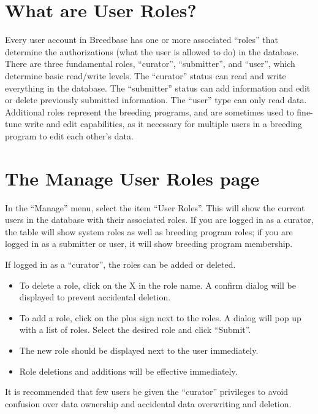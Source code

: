 \documentclass[
  12pt,
]{book}
\providecommand{\tightlist}{%
  \setlength{\itemsep}{0pt}\setlength{\parskip}{0pt}}
\begin{document}
\hypertarget{what-are-user-roles}{%
\section{What are User Roles?}\label{what-are-user-roles}}

Every user account in Breedbase has one or more associated ``roles'' that determine the authorizations (what the user is allowed to do) in the database. There are three fundamental roles, ``curator'', ``submitter'', and ``user'', which determine basic read/write levels. The ``curator'' status can read and write everything in the database. The ``submitter'' status can add information and edit or delete previously submitted information. The ``user'' type can only read data. Additional roles represent the breeding programs, and are sometimes used to fine-tune write and edit capabilities, as it necessary for multiple users in a breeding program to edit each other's data.

\hypertarget{the-manage-user-roles-page}{%
\section{The Manage User Roles page}\label{the-manage-user-roles-page}}

In the ``Manage'' menu, select the item ``User Roles''. This will show the current users in the database with their associated roles. If you are logged in as a curator, the table will show system roles as well as breeding program roles; if you are logged in as a submitter or user, it will show breeding program membership.

If logged in as a ``curator'', the roles can be added or deleted.

\begin{itemize}
\tightlist
\item
  To delete a role, click on the X in the role name. A confirm dialog will be displayed to prevent accidental deletion.
\item
  To add a role, click on the plus sign next to the roles. A dialog will pop up with a list of roles. Select the desired role and click ``Submit''.
\item
  The new role should be displayed next to the user immediately.
\item
  Role deletions and additions will be effective immediately.
\end{itemize}

It is recommended that few users be given the ``curator'' privileges to avoid confusion over data ownership and accidental data overwriting and deletion.
\end{document}
